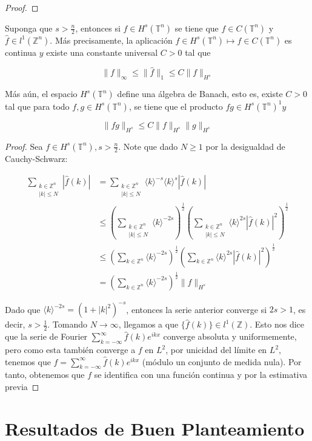\documentclass[12pt]{article}
\newcommand\Z{\ensuremath{\mathbb{Z}}}
\newcommand\T{\mathbb{T}}
\begin{document}
\begin{proof}
\end{proof}

\begin{theorem}\label{algebra}
Suponga que $s>\frac{n}{2}$, entonces si $f \in H^s\left(\mathbb{T}^n\right)$ se tiene que $f\in C\left(\mathbb{T}^n\right)$ y $\widehat{f} \in l^1\left(\mathbb{Z}^n\right)$. Más precisamente, la aplicación $f \in H^s\left(\mathbb{T}^n\right) \mapsto f \in C\left(\mathbb{T}^n\right)$ es continua $y$ existe una constante universal $C>0$ tal que

$$
\|f\|_{\infty} \leq\|\widehat{f}\|_1 \leq C\|f\|_{H^s}
$$


Más aún, el espacio $H^s\left(\mathbb{T}^n\right)$ define una álgebra de Banach, esto es, existe $C>0$ tal que para todo $f, g \in H^s\left(\mathbb{T}^n\right)$, se tiene que el producto $f g \in H^s\left(\mathbb{T}^n\right)^1 y$

$$
\|f g\|_{H^s} \leq C\|f\|_{H^s}\|g\|_{H^s}
$$
\end{theorem}

\begin{proof}

Sea $f \in H^s(\T^n), s>\frac{n}{2}$. Note que dado $N\geq 1$ por la desigualdad de Cauchy-Schwarz:

$$
\begin{aligned}
\sum_{\substack{k\in\Z^n\\
|k|\leq N}}|\widehat{f}(k)| & =\sum_{\substack{k\in\Z^n\\
|k|\leq N}}\langle k\rangle^{-s}\langle k\rangle^s|\widehat{f}(k)| \\
& \leq\left(\sum_{\substack{k\in\Z^n\\
|k|\leq N}}\langle k\rangle^{-2 s}\right)^{\frac{1}{2}}\left(\sum_{\substack{k\in\Z^n\\
|k|\leq N}}\langle k\rangle^{2 s}|\widehat{f}(k)|^2\right)^{\frac{1}{2}} \\
& \leq\left(\sum_{k\in \Z^n}\langle k\rangle^{-2 s}\right)^{\frac{1}{2}}\left(\sum_{k\in \Z^n}\langle k\rangle^{2 s}|\widehat{f}(k)|^2\right)^{\frac{1}{2}} \\
& =\left(\sum_{k\in \Z^n}\langle k\rangle^{-2 s}\right)^{\frac{1}{2}}\|f\|_{H^s}
\end{aligned}
$$


Dado que $\langle k\rangle^{-2 s}=\left(1+|k|^2\right)^{-s}$, entonces la serie anterior converge si $2 s>1$, es decir, $s>\frac{1}{2}$. Tomando $N \rightarrow \infty$, llegamos a que $\{\widehat{f}(k)\} \in l^1(\mathbb{Z})$. Esto nos dice que la serie de Fourier $\sum_{k=-\infty}^{\infty} \widehat{f}(k) e^{i k x}$ converge absoluta y uniformemente, pero como esta también converge a $f$ en $L^2$, por unicidad del límite en $L^2$, tenemos que $f=\sum_{k=-\infty}^{\infty} \widehat{f}(k) e^{i k x}$ (módulo un conjunto de medida nula). Por tanto, obtenemos que $f$ se identifica con una función continua y por la estimativa previa

\end{proof}


\section{Resultados de Buen Planteamiento}

\newpage



\nocite{*}
\end{document}
